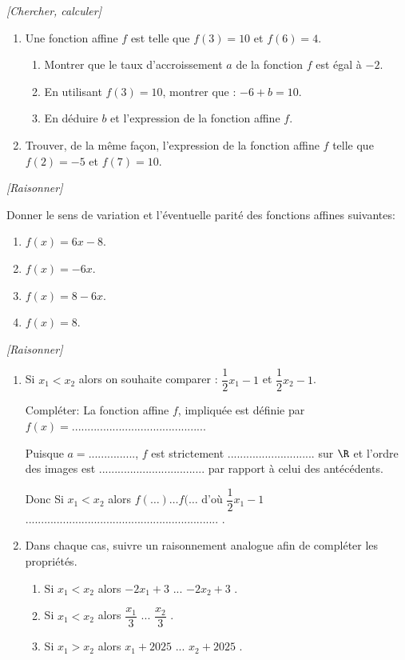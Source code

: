 \exo \textit{[Chercher, calculer]}

\begin{enumerate}
\item Une fonction affine $f$ est telle  que $f(3)=10$ et $f(6)=4$.
\begin{enumerate}[label=\alph*)]
\item Montrer que le taux d'accroissement $a$ de la fonction $f$ est égal à $-2$.
\item  En utilisant $f(3)=10$, montrer que : $-6+b=10$.
\item En déduire $b$ et l'expression de la fonction affine $f$.
\end{enumerate}
\item Trouver, de la même façon, l'expression de la fonction affine $f$ telle que $f(2)=-5$ et $f(7)=10$.
\end{enumerate}


\exo \textit{[Raisonner]}

Donner le sens de variation et l'éventuelle parité des fonctions affines suivantes:

\begin{enumerate}
\item $f(x)=6x-8$.
\item $f(x)=-6x$.
\item $f(x)=8-6x$.
\item $f(x)=8$.
\end{enumerate}

\exo \textit{[Raisonner]}

\begin{enumerate}
\item Si $x_1<x_2$ alors on souhaite comparer : $\dfrac{1}{2}x_1-1$ et $\dfrac{1}{2}x_2-1$.

Compléter:
La fonction affine $f$, impliquée est définie par  $f(x)=..........................................$.

Puisque $a=...............$, $f$ est strictement ............................ sur $\R$ et l'ordre des images est .................................. par rapport à celui des antécédents.

Donc \og Si $x_1<x_2$ alors $f(\ldots) \ldots f(\ldots $ d'où $\dfrac{1}{2}x_1-1$ ..............................................................\fg{} .


\item Dans chaque cas, suivre un raisonnement analogue afin de compléter les propriétés.

\begin{enumerate}[label=\alph*)]
\item \og Si $x_1<x_2$ alors $-2x_1+3$ ... $-2x_2+3$ \fg{}.
\item \og Si $x_1<x_2$ alors $\dfrac{x_1}{3}$ ... $\dfrac{x_2}{3}$ \fg{}.
\item \og Si $x_1>x_2$ alors $x_1+2025$ ... $x_2+2025$ \fg{}.
\end{enumerate}
\end{enumerate}

